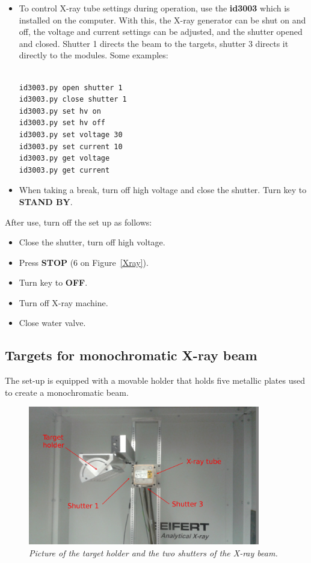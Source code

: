 \documentclass[a4paper,12pt,twoside]{article}
\begin{document}
\begin{itemize}
\item {To control X-ray tube settings during operation, use the \textbf{id3003} which is installed on the computer. With this, the X-ray generator can be shut on and off, the voltage and current settings can be adjusted, and the shutter opened and closed. Shutter 1 directs the beam to the targets, shutter 3 directs it directly to the modules. Some examples:
\\
\\
\begin{Verbatim}[frame=single]
id3003.py open shutter 1
id3003.py close shutter 1
id3003.py set hv on
id3003.py set hv off
id3003.py set voltage 30
id3003.py set current 10
id3003.py get voltage
id3003.py get current
\end{Verbatim}
}
\item{When taking a break, turn off high voltage and close the shutter. Turn key to \textbf{STAND BY}.}
\end{itemize}
After use, turn off the set up as follows:
\begin{itemize}
\item {Close the shutter, turn off high voltage.}
\item {Press \textbf{STOP} (6 on Figure~\ref{Xray}).}
\item {Turn key to \textbf{OFF}.}
\item {Turn off X-ray machine.}
\item {Close water valve.}
\end{itemize}
\subsection{Targets for monochromatic X-ray beam}

The set-up is equipped with a movable holder that holds five metallic plates used to create a monochromatic beam. 

\begin{figure} [h!] \centering 
\includegraphics[width=0.9\textwidth, angle=0] {./Targets.jpg}
\caption{\em  \label{Targets}
Picture of the target holder and the two shutters of the X-ray beam.}
\end{figure}
\end{document}
